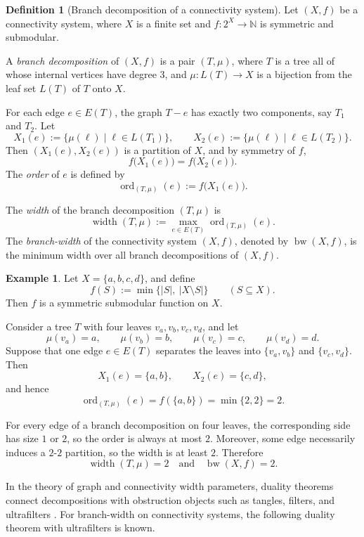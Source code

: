 \documentclass[10pt]{book}
\theoremstyle{definition}
\newtheorem{definition}[theorem]{Definition}
\newtheorem{example}[theorem]{Example}
\begin{document}
\begin{definition}[Branch decomposition of a connectivity system]\cite{10}
\label{def:branch-width}
Let \((X,f)\) be a connectivity system, where \(X\) is a finite set and
\(f:2^X\to \mathbb{N}\) is symmetric and submodular.

A \emph{branch decomposition} of \((X,f)\) is a pair \((T,\mu)\), where
\(T\) is a tree all of whose internal vertices have degree \(3\),
and \(\mu:L(T)\to X\) is a bijection from the leaf set \(L(T)\) of \(T\) onto \(X\).

For each edge \(e\in E(T)\), the graph \(T-e\) has exactly two components,
say \(T_1\) and \(T_2\).
Let
\[
X_1(e):=\{\mu(\ell)\mid \ell\in L(T_1)\},
\qquad
X_2(e):=\{\mu(\ell)\mid \ell\in L(T_2)\}.
\]
Then \((X_1(e),X_2(e))\) is a partition of \(X\), and by symmetry of \(f\),
\[
f\bigl(X_1(e)\bigr)=f\bigl(X_2(e)\bigr).
\]
The \emph{order} of \(e\) is defined by
\[
\operatorname{ord}_{(T,\mu)}(e):=f\bigl(X_1(e)\bigr).
\]

The \emph{width} of the branch decomposition \((T,\mu)\) is
\[
\operatorname{width}(T,\mu):=
\max_{e\in E(T)} \operatorname{ord}_{(T,\mu)}(e).
\]
The \emph{branch-width} of the connectivity system \((X,f)\), denoted by
\(\operatorname{bw}(X,f)\), is the minimum width over all branch decompositions of \((X,f)\).
\end{definition}

\begin{example}
\label{ex:branchwidth-connectivity}
Let \(X=\{a,b,c,d\}\), and define
\[
f(S):=\min\{|S|,\ |X\setminus S|\}
\qquad (S\subseteq X).
\]
Then \(f\) is a symmetric submodular function on \(X\).

Consider a tree \(T\) with four leaves \(v_a,v_b,v_c,v_d\), and let
\[
\mu(v_a)=a,\qquad \mu(v_b)=b,\qquad \mu(v_c)=c,\qquad \mu(v_d)=d.
\]
Suppose that one edge \(e\in E(T)\) separates the leaves into
\(\{v_a,v_b\}\) and \(\{v_c,v_d\}\).
Then
\[
X_1(e)=\{a,b\},
\qquad
X_2(e)=\{c,d\},
\]
and hence
\[
\operatorname{ord}_{(T,\mu)}(e)=f(\{a,b\})=\min\{2,2\}=2.
\]

For every edge of a branch decomposition on four leaves, the corresponding side has
size \(1\) or \(2\), so the order is always at most \(2\).
Moreover, some edge necessarily induces a \(2\)-\(2\) partition, so the width is at least \(2\).
Therefore
\[
\operatorname{width}(T,\mu)=2
\quad\text{and}\quad
\operatorname{bw}(X,f)=2.
\]
\end{example}

In the theory of graph and connectivity width parameters,
duality theorems connect decompositions with obstruction objects such as tangles,
filters, and ultrafilters \cite{9,10,bozyk2022objects,4,16,albrechtsen2024tangle}.
For branch-width on connectivity systems, the following duality theorem with ultrafilters is known.
\end{document}
